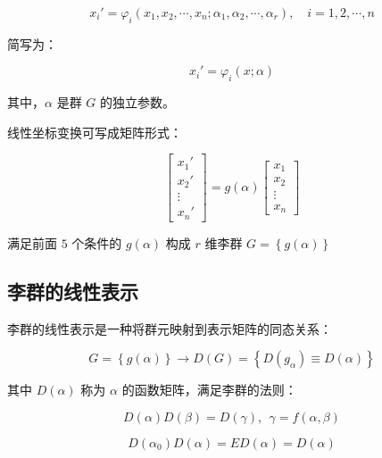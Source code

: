 \begin{equation}
x_i'
=\varphi_i\left(x_1,x_2,\cdots,x_n;\alpha_1,\alpha_2,\cdots,\alpha_r\right),\quad i=1,2,\cdots,n
\end{equation}

简写为：

\begin{equation}
x_i'
=\varphi_i\left(x;\alpha\right)
\end{equation}

其中，$\alpha$ 是群 $G$ 的独立参数。

线性坐标变换可写成矩阵形式：

\begin{equation}
\begin{bmatrix}
x_1' \\
x_2' \\
\vdots \\
x_n'
\end{bmatrix}
=g\left(\alpha\right)
\begin{bmatrix}
x_1 \\
x_2 \\
\vdots \\
x_n
\end{bmatrix}
\end{equation}

满足前面 $5$ 个条件的 $g\left(\alpha\right)$ 构成 $r$ 维李群 $G=\left\{g\left(\alpha\right) \right\}$

\subsection{李群的线性表示}

李群的线性表示是一种将群元映射到表示矩阵的同态关系：

\begin{equation}
G=\left\{g\left(\alpha\right) \right\}
\to 
D\left(G\right)
=\left\{D\left(g_\alpha\right)\equiv D\left(\alpha\right) \right\}
\end{equation}

其中 $D\left(\alpha\right)$ 称为 $\alpha$ 的函数矩阵，满足李群的法则：

\begin{equation}
D\left(\alpha\right)D\left(\beta\right)
=D\left(\gamma\right),~~\gamma = f\left(\alpha,\beta\right)
\end{equation}

\begin{equation}
D\left(\alpha_0\right)D\left(\alpha\right)
=E D\left(\alpha\right)
=D\left(\alpha\right)
\end{equation}

